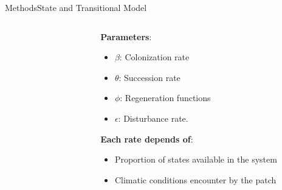 \documentclass[10pt,aspectratio=149]{beamer}
\begin{document}
\begin{frame}{Methods}{State and Transitional Model}

\begin{columns}[c]
	\begin{column}[c]{.40\paperwidth}
		\begin{figure}
			\small{}
		\end{figure}
	\end{column}
	\begin{column}[l]{.40\paperwidth}
	\textbf{Parameters}:
	\begin{itemize}
		\item $\beta$: Colonization rate\\
		\item $\theta$: Succession rate\\
		\item $\phi$: Regeneration functions\\
		\item $\epsilon$: Disturbance rate.
	\end{itemize}
	\vspace{1em}
	\textbf{Each rate depends of}:
		\begin{itemize}
			\item Proportion of states available in the system
			\item Climatic conditions encounter by the patch
		\end{itemize}
	\end{column}
\end{columns}

\end{frame}
\end{document}
